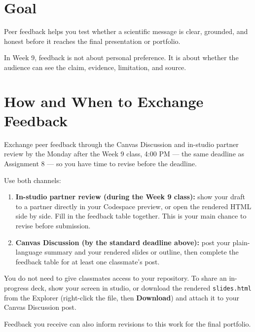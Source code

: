 \documentclass[
  letterpaper,
  DIV=11,
  numbers=noendperiod,
  oneside]{scrreprt}
\providecommand{\tightlist}{%
  \setlength{\itemsep}{0pt}\setlength{\parskip}{0pt}}
\begin{document}
\section*{Goal}\label{goal-10}


Peer feedback helps you test whether a scientific message is clear,
grounded, and honest before it reaches the final presentation or
portfolio.

In Week 9, feedback is not about personal preference. It is about
whether the audience can see the claim, evidence, limitation, and
source.

\section*{How and When to Exchange
Feedback}\label{how-and-when-to-exchange-feedback}


Exchange peer feedback through the Canvas Discussion and in-studio
partner review by the Monday after the Week 9 class, 4:00 PM --- the
same deadline as Assignment 8 --- so you have time to revise before the
deadline.

Use both channels:

\begin{enumerate}
\def\labelenumi{\arabic{enumi}.}
\tightlist
\item
  \textbf{In-studio partner review (during the Week 9 class):} show your
  draft to a partner directly in your Codespace preview, or open the
  rendered HTML side by side. Fill in the feedback table together. This
  is your main chance to revise before submission.
\item
  \textbf{Canvas Discussion (by the standard deadline above):} post your
  plain-language summary and your rendered slides or outline, then
  complete the feedback table for at least one classmate's post.
\end{enumerate}

You do not need to give classmates access to your repository. To share
an in-progress deck, show your screen in studio, or download the
rendered \texttt{slides.html} from the Explorer (right-click the file,
then \textbf{Download}) and attach it to your Canvas Discussion post.

Feedback you receive can also inform revisions to this work for the
final portfolio.
\end{document}
